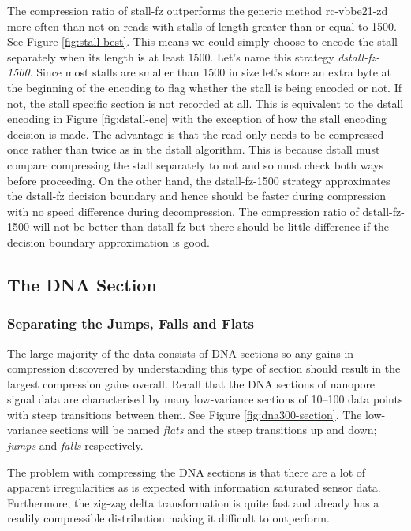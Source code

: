 The compression ratio of stall-fz outperforms the generic method rc-vbbe21-zd
more often than not on reads with stalls of length greater than or equal to
1500. See Figure
\ref{fig:stall-best}. This means we could simply choose to encode the stall
separately when its length is at least 1500. Let's name this strategy
\textit{dstall-fz-1500}. Since most stalls are smaller than
1500 in size let's store an extra byte at the beginning of the encoding to flag
whether the stall is being encoded or not. If not, the stall specific section is
not recorded at all. This is equivalent to the dstall encoding in Figure
\ref{fig:dstall-enc} with the exception of how the stall encoding decision is
made. The advantage is that the read only needs to be compressed once rather
than twice as in the dstall algorithm. This is because dstall must compare
compressing the stall separately to not and so must check both ways before
proceeding. On the other hand, the dstall-fz-1500 strategy approximates the
dstall-fz decision boundary and hence should be faster during compression with
no speed difference during decompression. The compression ratio of
dstall-fz-1500 will not be better than dstall-fz but there should be little
difference if the decision boundary approximation is good.

%


\subsection{The DNA Section}



\subsubsection{Separating the Jumps, Falls and Flats}



The large majority of the data consists of DNA sections so any gains in
compression discovered by understanding this type of section should
result in the largest compression gains overall. Recall that the DNA sections of
nanopore signal data are characterised by many low-variance sections of 10--100
data points with steep transitions between them. See Figure
\ref{fig:dna300-section}. The low-variance sections will be named \textit{flats}
and the steep transitions up and down; \textit{jumps} and \textit{falls}
respectively.

The problem with compressing the DNA sections is that there are a lot of
apparent irregularities as is expected with information saturated sensor data.
Furthermore, the zig-zag delta transformation is quite fast and already has a
readily compressible distribution making it difficult to outperform.

